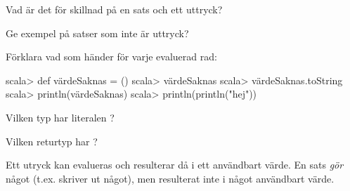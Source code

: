 \SOLUTION

\TaskSolved \what

\begin{ConceptConnections}

\end{ConceptConnections}

%
%
%
%
%
%
%
%
%
%
%
%
%
%
%
%
%
%
%
%
%
%
%
%


\QUESTEND





\QUESTBEGIN

\Task \what

\Subtask Vad är det för skillnad på en sats och ett uttryck?

\Subtask Ge exempel på satser som inte är uttryck?

\Subtask Förklara vad som händer för varje evaluerad rad:
\begin{REPL}
scala> def värdeSaknas = ()
scala> värdeSaknas
scala> värdeSaknas.toString
scala> println(värdeSaknas)
scala> println(println("hej"))
\end{REPL}

\Subtask Vilken typ har literalen \code{()}?

\Subtask Vilken returtyp har ?

\SOLUTION

\TaskSolved \what

\SubtaskSolved  Ett utryck kan evalueras och resulterar då i ett användbart värde. En sats \emph{gör} något (t.ex. skriver ut något), men resulterat inte i något användbart värde.

